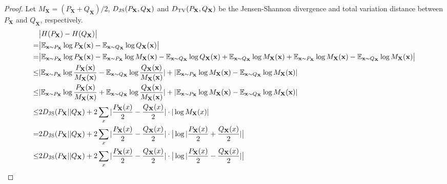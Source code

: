 \begin{proof}
Let $M_{\mathbf{X}}= (P_{{\mathbf{X}}}+Q_{{\mathbf{X}}})/2$, $D_{\rm JS}(P_{\mathbf{X}},Q_{\mathbf{X}})$ and $D_{\rm TV}(P_{\mathbf{X}},Q_{\mathbf{X}})$ be the Jensen-Shannon divergence and total variation distance between $P_{{\mathbf{X}}}$ and $Q_{\mathbf{X}}$, respectively.
\begin{align*}
& \big | H(P_{\mathbf{X}}) - H(Q_{\mathbf{X}}) \big | \\
=& \big | \mathbb{E}_{\mathbf{x}\sim P_{{\mathbf{X}}}} \log P_{\mathbf{X}}(\mathbf{x}) -  \mathbb{E}_{\mathbf{x}\sim Q_{{\mathbf{X}}}} \log Q_{{\mathbf{X}}}(\mathbf{x}) \big | \\
=& \big | \mathbb{E}_{\mathbf{x}\sim P_{\mathbf{X}}} \log P_{\mathbf{X}}(\mathbf{x}) - \mathbb{E}_{\mathbf{x}\sim P_{\mathbf{X}}} \log M_{\mathbf{X}}(\mathbf{x}) - \mathbb{E}_{\mathbf{x}\sim Q_{\mathbf{X}}} \log Q_{\mathbf{X}}(\mathbf{x}) + \mathbb{E}_{\mathbf{x}\sim Q_{\mathbf{X}}} \log M_{\mathbf{X}}(\mathbf{x}) +\mathbb{E}_{\mathbf{x}\sim P_{\mathbf{X}}} \log M_{\mathbf{X}}(\mathbf{x}) -\mathbb{E}_{\mathbf{x}\sim Q_{\mathbf{X}}} \log M_{\mathbf{X}}(\mathbf{x})  \big | \\ 
\leq & | \mathbb{E}_{\mathbf{x}\sim P_{\mathbf{X}}} \log \frac{P_{\mathbf{X}}(\mathbf{x})}{M_{\mathbf{X}}(\mathbf{x})} - \mathbb{E}_{\mathbf{x}\sim Q_{\mathbf{X}}} \log \frac{Q_{\mathbf{X}}(\mathbf{x})}{M_{\mathbf{X}}(\mathbf{x})} | + | \mathbb{E}_{\mathbf{x}\sim P_{\mathbf{X}}} \log M_{\mathbf{X}}(\mathbf{x}) - \mathbb{E}_{\mathbf{x}\sim Q_{\mathbf{X}}} \log M_{\mathbf{X}}(\mathbf{x})| \\
\leq & | \mathbb{E}_{\mathbf{x}\sim P_{\mathbf{X}}} \log \frac{P_{\mathbf{X}}(\mathbf{x})}{M_{\mathbf{X}}(\mathbf{x})} + \mathbb{E}_{\mathbf{x}\sim Q_{\mathbf{X}}} \log \frac{Q_{\mathbf{X}}(\mathbf{x})}{M_{\mathbf{X}}(\mathbf{x})} | + | \mathbb{E}_{\mathbf{x}\sim P_{\mathbf{X}}} \log M_{\mathbf{X}}(\mathbf{x}) - \mathbb{E}_{\mathbf{x}\sim Q_{\mathbf{X}}} \log M_{\mathbf{X}}(\mathbf{x})| \\
\leq & 2 D_{\rm JS}(P_{\mathbf{X}}||Q_{\mathbf{X}}) + 2 \sum_{x} |\frac{P_{\mathbf{X}}(x)}{2} - \frac{Q_{\mathbf{X}}(x)}{2}| \cdot | \log M_{\mathbf{X}}(x)|  \\
= & 2 D_{\rm JS}(P_{\mathbf{X}}||Q_{\mathbf{X}}) + 2 \sum_{x} |\frac{P_{\mathbf{X}}(x)}{2} - \frac{Q_{\mathbf{X}}(x)}{2}| \cdot \big| \log |\frac{P_{\mathbf{X}}(x)}{2} + \frac{Q_{\mathbf{X}}(x)}{2}|\big|  \\
\leq & 2 D_{\rm JS}(P_{\mathbf{X}}||Q_{\mathbf{X}}) + 2 \sum_{x} |\frac{P_{\mathbf{X}}(x)}{2} - \frac{Q_{\mathbf{X}}(x)}{2}| \cdot \big| \log |\frac{P_{\mathbf{X}}(x)}{2} - \frac{Q_{\mathbf{X}}(x)}{2}|\big|  \\

\end{align*}
\end{proof}
